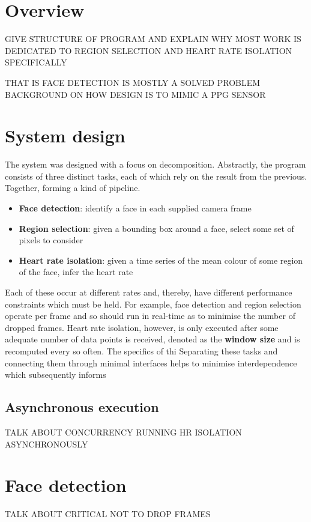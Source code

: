 \section{Overview}

GIVE STRUCTURE OF PROGRAM AND EXPLAIN WHY MOST WORK IS DEDICATED TO REGION
SELECTION AND HEART RATE ISOLATION SPECIFICALLY

THAT IS FACE DETECTION IS MOSTLY A SOLVED PROBLEM
BACKGROUND ON HOW DESIGN IS TO MIMIC A PPG SENSOR

\section{System design}
The system was designed with a focus on decomposition. Abstractly, the program consists of three distinct tasks, each of which rely on the result from the previous. Together, forming a kind of pipeline. 
\begin{itemize}
    \item \textbf{Face detection}: identify a face in each supplied camera frame
    \item \textbf{Region selection}: given a bounding box around a face, select some set of pixels to consider 
    \item \textbf{Heart rate isolation}: given a time series of the mean colour of some region of the face, infer the heart rate
\end{itemize}
Each of these occur at different rates and, thereby, have different performance constraints which must be held.
For example, face detection and region selection operate per frame and so should run in real-time as to minimise the number of dropped frames.
Heart rate isolation, however, is only executed after some adequate number of data points is received, denoted as the \textbf{window size} and is recomputed every so often. The specifics of thi
Separating these tasks and connecting them through minimal interfaces helps to minimise interdependence which subsequently informs

\subsection{Asynchronous execution}
TALK ABOUT CONCURRENCY RUNNING HR ISOLATION ASYNCHRONOUSLY
\section{Face detection}
TALK ABOUT CRITICAL NOT TO DROP FRAMES

